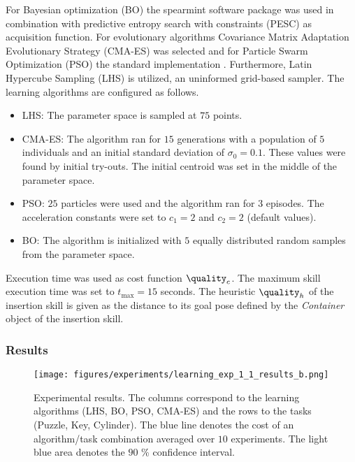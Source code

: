 For Bayesian optimization (BO) the spearmint software package \cite{Brochu.2010,Snoek.2012,Snoek.2013,Swersky.2013} was used in combination with predictive entropy search with constraints (PESC) \cite{HernandezLobato.2015} as acquisition function.
For evolutionary algorithms Covariance Matrix Adaptation Evolutionary Strategy (CMA-ES) \cite{Hansen.2001,Hansen.2006} was selected and for Particle Swarm Optimization (PSO) the standard implementation \cite{Poli.2007}.
Furthermore, Latin Hypercube Sampling (LHS) \cite{McKay.1979,loh1996latin} is utilized, an uninformed grid-based sampler.
The learning algorithms are configured as follows.

\begin{itemize}
\item LHS: The parameter space is sampled at $75$ points.
\item CMA-ES: The algorithm ran for $15$ generations with a population of $5$ individuals and an initial standard deviation of $\sigma_0=0.1$.
These values were found by initial try-outs.
The initial centroid was set in the middle of the parameter space.
\item PSO: $25$ particles were used and the algorithm ran for $3$ episodes.
The acceleration constants were set to $c_1=2$ and $c_2=2$ (default values).
\item BO: The algorithm is initialized with $5$ equally distributed random samples from the parameter space.
\end{itemize}

Execution time was used as cost function $\quality_c$.
The maximum skill execution time was set to $t_\text{max}=15$ seconds.
The heuristic $\quality_h$ of the insertion skill is given as the distance to its goal pose defined by the \textit{Container} object of the insertion skill.

\subsubsection{Results}

\begin{figure}[ht!]
\texttt{[image: figures/experiments/learning\_exp\_1\_1\_results\_b.png]}
\caption{Experimental results. The columns correspond to the learning algorithms (LHS, BO, PSO, CMA-ES) and the rows to the tasks (Puzzle, Key, Cylinder). The blue line denotes the cost of an algorithm/task combination averaged over $10$ experiments. The light blue area denotes the $90$ \% confidence interval.}
\label{fig:learning:exp_1_1:results}
\end{figure}

